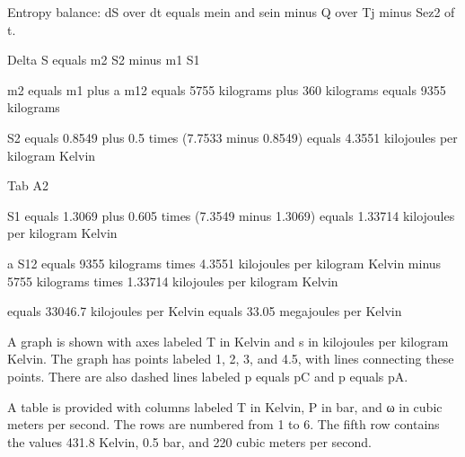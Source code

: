 Entropy balance: dS over dt equals mein and sein minus Q over Tj minus Sez2 of t.

Delta S equals m2 S2 minus m1 S1

m2 equals m1 plus a m12 equals 5755 kilograms plus 360 kilograms equals 9355 kilograms

S2 equals 0.8549 plus 0.5 times (7.7533 minus 0.8549) equals 4.3551 kilojoules per kilogram Kelvin

Tab A2

S1 equals 1.3069 plus 0.605 times (7.3549 minus 1.3069) equals 1.33714 kilojoules per kilogram Kelvin

a S12 equals 9355 kilograms times 4.3551 kilojoules per kilogram Kelvin minus 5755 kilograms times 1.33714 kilojoules per kilogram Kelvin

equals 33046.7 kilojoules per Kelvin equals 33.05 megajoules per Kelvin

A graph is shown with axes labeled T in Kelvin and s in kilojoules per kilogram Kelvin. The graph has points labeled 1, 2, 3, and 4.5, with lines connecting these points. There are also dashed lines labeled p equals pC and p equals pA. 

A table is provided with columns labeled T in Kelvin, P in bar, and ω in cubic meters per second. The rows are numbered from 1 to 6. The fifth row contains the values 431.8 Kelvin, 0.5 bar, and 220 cubic meters per second.